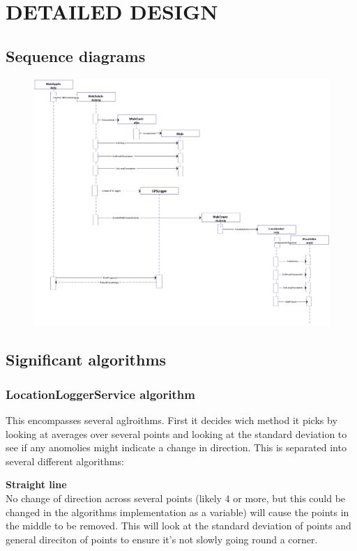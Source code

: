 \documentclass{project}
\begin{document}
\newpage

\section{DETAILED DESIGN}
\subsection{Sequence diagrams}

\begin{figure}[h] 

    \includegraphics[width=15cm]{sequence.png}
    
\end{figure}

\newpage

\subsection{Significant algorithms}
\subsubsection{LocationLoggerService algorithm}

This encompasses several aglroithms. First it decides wich method it picks by
looking at averages over several points and looking at the standard deviation
to see if any anomolies might indicate a change in direction. This is separated
into several different algorithms:

\textbf{Straight line} \\
No change of direction across several points (likely 4 or more, but this could
be changed in the algorithms implementation as a variable) will cause the
points in the middle to be removed. This will look at the standard deviation of
points and general direciton of points to ensure it's not slowly going round a
corner.
\end{document}
